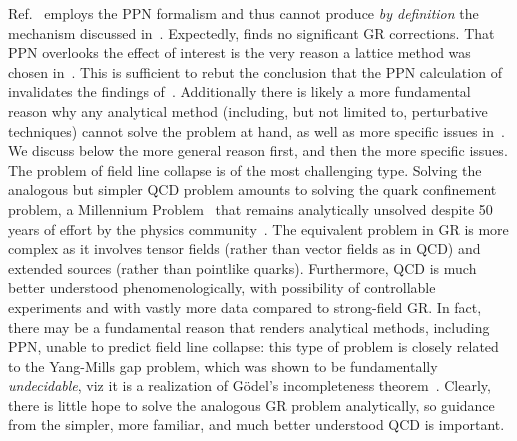 \documentclass[superscriptaddress,amsmath,amssymb,nofootinbib]{revtex4}
\begin{document}
Ref.~\cite{Barker:2023xsx} employs the PPN formalism and thus cannot produce {\it by definition} the mechanism discussed 
in~\cite{Deur:2009ya, Deur:2016bwq, Deur:2017aas}. Expectedly, \cite{Barker:2023xsx} finds no significant GR corrections.  
That PPN overlooks the effect of interest is the very reason a lattice method was chosen in~\cite{Deur:2009ya, Deur:2016bwq}. 
%
This is sufficient to rebut the conclusion that the PPN calculation of~\cite{Barker:2023xsx} invalidates the findings of~\cite{Deur:2009ya, Deur:2016bwq}. 
Additionally there is likely a more fundamental reason why any analytical method (including, but not limited to, perturbative techniques) cannot solve the problem at hand,
as well as more specific issues in~\cite{Barker:2023xsx}. We discuss below the more general reason first, and then the more specific issues.\\


The problem of field line collapse is of the most challenging type. 
Solving the analogous but simpler QCD problem amounts to solving the quark confinement problem, 
a Millennium Problem~\cite{Millennium Prize Problems} that remains analytically unsolved despite 50 years of effort by  
the physics community~\cite{the: Greensite conf.}. 
The equivalent problem in GR is more complex as 
it involves tensor fields (rather than vector fields as in QCD) and extended sources (rather than pointlike quarks). Furthermore, QCD is much better understood 
phenomenologically, with possibility of controllable experiments and with vastly more data compared to strong-field GR. 
In fact, there may be a fundamental reason that renders analytical methods, including PPN, unable to predict field line collapse: this type of problem 
is closely related to the Yang-Mills gap problem, which was shown to be fundamentally {\it undecidable}, viz it is a realization of G{\"o}del's incompleteness theorem~\cite{Cubitt:2015xsa}. 
%
Clearly, there is little hope to solve the analogous  GR problem 
analytically, %
so guidance from the simpler, more familiar, and much better understood QCD is important.
\end{document}
